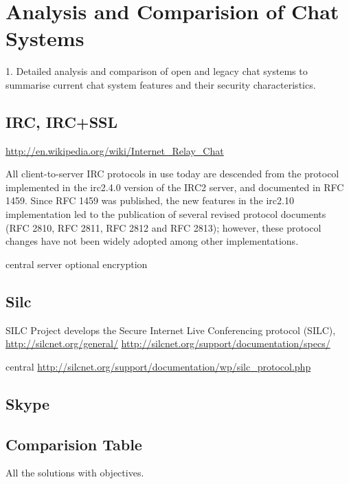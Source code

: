 \section{Analysis and Comparision of Chat Systems}

    1. Detailed analysis and comparison of open and legacy chat systems
        to summarise current chat system features and their
        security characteristics.


\subsection{IRC, IRC+SSL}
\url{http://en.wikipedia.org/wiki/Internet_Relay_Chat}

All client-to-server IRC protocols in use today are descended from the protocol implemented in the irc2.4.0 version of the IRC2 server, and documented in RFC 1459. Since RFC 1459 was published, the new features in the irc2.10 implementation led to the publication of several revised protocol documents (RFC 2810, RFC 2811, RFC 2812 and RFC 2813); however, these protocol changes have not been widely adopted among other implementations.

central server
optional encryption

\subsection{Silc}
SILC Project develops the Secure Internet Live Conferencing protocol (SILC),
\url{http://silcnet.org/general/}
\url{http://silcnet.org/support/documentation/specs/}

central
\url{http://silcnet.org/support/documentation/wp/silc_protocol.php}


\subsection{Skype}


\subsection{Comparision Table}
All the solutions with objectives.
